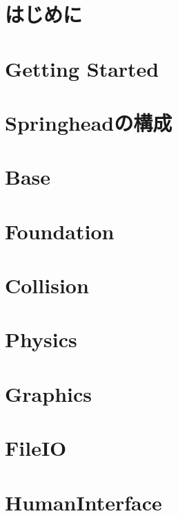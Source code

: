 \chapter{\KLUDGE はじめに}
\label{chap_intro}


\chapter{Getting Started}
\label{chap_getstarted}


\chapter{Springhead\KLUDGE の構成}
\label{chap_structure}


\chapter{Base}
\label{chap_base}


\chapter{Foundation}
\label{chap_foundation}


\chapter{Collision}
\label{chap_collision}


\chapter{Physics}
\label{chap_physics}


\chapter{Graphics}
\label{chap_graphics}


\chapter{FileIO}
\label{chap_fileio}


\chapter{HumanInterface}
\label{chap_humaninterface}


